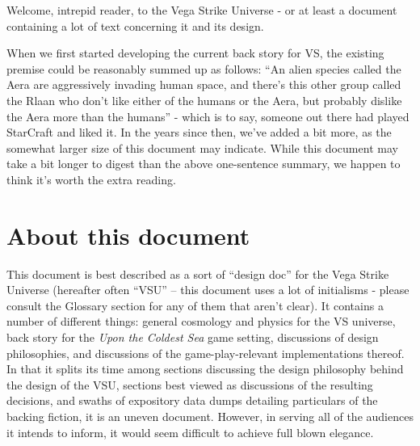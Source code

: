 Welcome, intrepid reader, to the Vega Strike Universe - or at least a
document containing a lot of text concerning it and its design.

When we first started developing the current back story for VS, the
existing premise could be reasonably summed up as follows: ``An alien
species called the Aera are aggressively invading human space, and
there's this other group called the Rlaan who don't like either of the
humans or the Aera, but probably dislike the Aera more than the
humans'' - which is to say, someone out there had played StarCraft and
liked it. In the years since then, we've added a bit more, as the
somewhat larger size of this document may indicate. While this
document may take a bit longer to digest than the above one-sentence
summary, we happen to think it's worth the extra reading.

\section*{About this document}
This document is best described as a sort of ``design doc'' for the Vega
Strike Universe (hereafter often ``VSU'' -- this document uses a lot
of initialisms - please consult the Glossary section for any of them
that aren't clear). It contains a number of different things: general
cosmology and physics for the VS universe, back story for the {\it
Upon the Coldest Sea} game setting, discussions of design
philosophies, and discussions of the game-play-relevant implementations thereof. In that
it splits its time among sections discussing the design philosophy
behind the design of the VSU, sections best viewed as discussions of
the resulting decisions, and swaths of expository data dumps detailing
particulars of the backing fiction, it is an uneven document. However,
in serving all of the audiences it intends to inform, it would seem
difficult to achieve full blown elegance.

